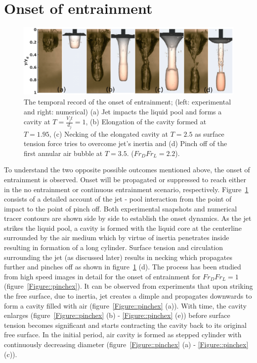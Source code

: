 \section{Onset of entrainment}
\begin{figure}
	\centering
	\includegraphics[width=\linewidth]{chapters/jetPool/Figure9}
	\caption{The temporal record of the onset of entrainment; (left: experimental and right: numerical) (a) Jet impacts the liquid pool and forms a cavity at $T = \frac{V_jt}{d_j} = 1$, (b) Elongation of the cavity formed at $T = 1.95$, (c) Necking of the elongated cavity at $T =2.5 $ as surface tension force tries to overcome jet's inertia and (d) Pinch off of the first annular air bubble at $T = 3.5$. ($Fr_DFr_L = 2.2$).}
	\label{Figure::pinchNum}
\end{figure}
To understand the two opposite possible outcomes mentioned above, the onset of entrainment is observed. Onset will be propagated or suppressed to reach either in the no entrainment or continuous entrainment scenario, respectively. Figure~\ref{Figure::pinchNum} consists of a detailed account of the jet - pool interaction from the point of impact to the point of pinch off. Both experimental snapshots and numerical tracer contours are shown side by side to establish the onset dynamics. As the jet strikes the liquid pool, a cavity is formed with the liquid core at the centerline surrounded by the air medium which by virtue of inertia penetrates inside resulting in formation of a long cylinder. Surface tension and circulation surrounding the jet (as discussed later) results in necking which propagates further and pinches off as shown in figure~\ref{Figure::pinchNum} (d). The process has been studied from high speed images in detail for the onset of entrainment for $Fr_DFr_L = 1$ (figure~\ref{Figure::pinchex}). It can be observed from experiments that upon striking the free surface, due to inertia, jet creates a dimple and propagates downwards to form a cavity filled with air (figure~\ref{Figure::pinchex} (a)). With time, the cavity enlarges (figure~\ref{Figure::pinchex} (b) - \ref{Figure::pinchex} (e)) before surface tension becomes significant and starts contracting the cavity back to its original free surface. In the initial period, air cavity is formed as stepped cylinder with continuously decreasing diameter (figure~\ref{Figure::pinchex} (a) - \ref{Figure::pinchex} (c)). \\
